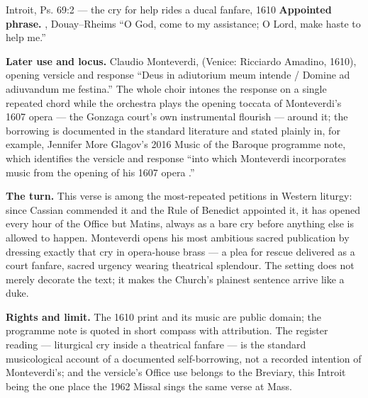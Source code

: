 \begin{afterlife}{Introit, Ps. 69:2 --- the cry for help rides a ducal fanfare, 1610}
\textbf{Appointed phrase.} , Douay--Rheims ``O God, come to my assistance; O Lord,
make haste to help me.''

\textbf{Later use and locus.} Claudio Monteverdi,  (Venice: Ricciardo Amadino, 1610), opening versicle and response
``Deus in adiutorium meum intende / Domine ad adiuvandum me festina.'' The
whole choir intones the response on a single repeated chord while the
orchestra plays the opening toccata of Monteverdi's 1607 opera 
--- the Gonzaga court's own instrumental flourish --- around it; the borrowing
is documented in the standard literature and stated plainly in, for example,
Jennifer More Glagov's 2016 Music of the Baroque programme note, which
identifies the versicle and response ``into which Monteverdi incorporates
music from the opening of his 1607 opera .''

\textbf{The turn.} This verse is among the most-repeated petitions in Western
liturgy: since Cassian commended it and the Rule of Benedict appointed it, it
has opened every hour of the Office but Matins, always as a bare cry before
anything else is allowed to happen. Monteverdi opens his most ambitious sacred
publication by dressing exactly that cry in opera-house brass --- a plea for
rescue delivered as a court fanfare, sacred urgency wearing theatrical
splendour. The setting does not merely decorate the text; it makes the
Church's plainest sentence arrive like a duke.

\textbf{Rights and limit.} The 1610 print and its music are public domain; the
programme note is quoted in short compass with attribution. The register
reading --- liturgical cry inside a theatrical fanfare --- is the standard
musicological account of a documented self-borrowing, not a recorded intention
of Monteverdi's; and the versicle's Office use belongs to the Breviary, this
Introit being the one place the 1962 Missal sings the same verse at Mass.
\end{afterlife}
